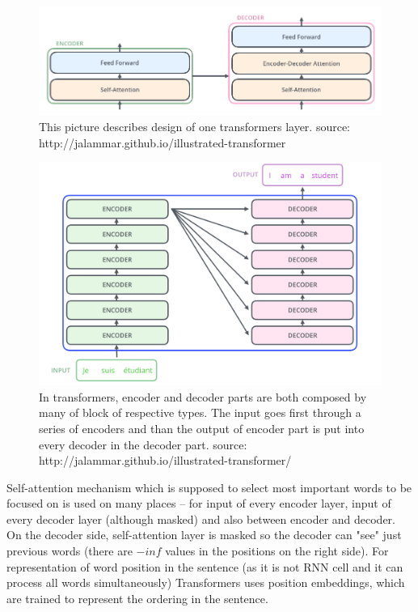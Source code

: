 \begin{figure}[h]
\centering
\includegraphics[width=1\columnwidth]{../img/encoder_decoder}
\protect\caption{This picture describes design of one transformers layer. source: http://jalammar.github.io/illustrated-transformer }
\label{pic:enco_deco}
\end{figure}

\begin{figure}[h]
\centering
\includegraphics[width=1\columnwidth]{../img/encoder_decoder_all}
\protect\caption{ In transformers, encoder and decoder parts are both composed by many of block of respective types. The input goes first through a series of encoders and than the output of encoder part is put into every decoder in the decoder part. %
source: http://jalammar.github.io/illustrated-transformer/  }
\label{pic:enco_deco_all}
\end{figure}

Self-attention mechanism which is supposed to select most important words to be focused on is used on many places -- for input of every encoder layer, input of every decoder layer (although masked) and also between encoder and decoder. On the decoder side, self-attention layer is masked so the decoder can "see" just previous words (there are $-inf$ values in the positions on the right side). For representation of word position in the sentence (as it is not RNN cell and it can process all words simultaneously) Transformers uses position embeddings, which are trained to represent the ordering in the sentence.


